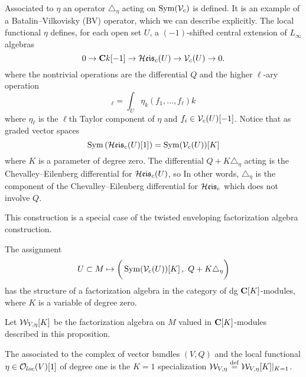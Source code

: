 \documentclass[11pt]{amsart}
\begin{document}
Associated to $\eta$ an operator $\triangle_{\eta}$ acting on $\operatorname{Sym}(\mathcal V_{c})$ is defined.
It is an example of a Batalin--Vilkovisky (BV) operator, which we can describe explicitly.
The local functional $\eta$ defines, for each open set $U$, a $(-1)$-shifted central extension of $L_{\infty}$ algebras
\begin{equation}
0 \to \mathbf{C} k [-1] \to \mathcal H\mathfrak{eis}_c(U) \to \mathcal V_c(U) \to 0 .
\end{equation}
where the nontrivial operations are the differential $Q$ and the higher $\ell$-ary operation
\begin{equation}
[f_1,\ldots,f_\ell]_\ell = \int_U \eta_k(f_1,\ldots,f_\ell) k
\end{equation}
where $\eta_{\ell}$ is the $\ell$th Taylor component of $\eta$ and $f_{i}\in \mathcal V_c(U)[-1]$.
Notice that as graded vector spaces
\begin{equation}
\operatorname{Sym}\left(\mathcal H\mathfrak{eis}_c (U) [1] \right) = \operatorname{Sym}(\mathcal V_c(U))[K]
\end{equation}
where $K$ is a parameter of degree zero.
The differential $Q + K \triangle_\eta$ acting is the Chevalley--Eilenberg differential for $\mathcal H\mathfrak{eis}_c(U)$, so
In other words, $\triangle_{\eta}$ is the component of the Chevalley--Eilenberg differential for $\mathcal H\mathfrak{eis}_{c}$ which does not involve $Q$.

This construction is a special case of the twisted enveloping factorization algebra construction.

\begin{prop}[\cite{CG1}]
The assignment
\begin{equation}
U \subset M \mapsto \bigg(\operatorname{Sym}(\mathcal V_c(U))[K] \,, \, \,Q + K \triangle_\eta \bigg)
\end{equation}
has the structure of a factorization algebra in the category of dg $\mathbf{C}[K]$-modules, where $K$ is a variable of degree zero.
\end{prop}

Let $\mathcal W_{V,\eta}[K]$ be the factorization algebra on $M$ valued in $\mathbf{C}[K]$-modules described in this proposition.

\begin{dfn}\label{dfn:weyl}
The  associated to the complex of vector bundles $(V,Q)$ and the local functional $\eta \in {\mathcal O}_{loc}(V)[1]$ of degree one is the $K=1$ specialization $\mathcal W_{V,\eta} \overset{\rm def}{=} \mathcal W_{V,\eta}[K]|_{K=1}$.
\end{dfn}
\end{document}
